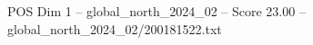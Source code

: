 \begin{textsample}{POS Dim 1 – global\_north\_2024\_02 – Score 23.00 – global\_north\_2024\_02/200181522.txt}
\end{textsample}
